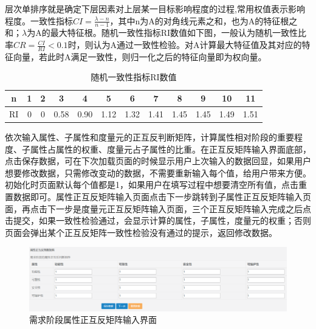 \begin{itemize}
层次单排序就是确定下层因素对上层某一目标影响程度的过程,常用权值表示影响程度\cite{刘畅2006我国火电企业投资决策影响因素评价方法及模型研究}。一致性指标$CI=\frac{\lambda-n}{n-1}$，其中n为A的对角线元素之和，也为A的特征根之和；$\lambda$为A的最大特征根。随机一致性指标RI数值如下图，一般认为随机一致性比率$CR=\frac{CI}{RI}<0.1$时，则认为A通过一致性检验。对A计算最大特征值及其对应的特征向量，若此时A满足一致性，则归一化之后的特征向量即为权向量。


\begin{table}[!ht]
    \centering
    \caption{随机一致性指标RI数值}
    \begin{tabular}{|c|c|c|c|c|c|c|c|c|c|c|c|}
        \hline
         n & 1 & 2 & 3 & 4 & 5 & 6 & 7 & 8 & 9 & 10 & 11  \\
         \hline
         RI & 0 & 0 & 0.58 & 0.90 & 1.12 & 1.32 & 1.41 & 1.45 &1.45 &1.49 & 1.51\\
        \hline
    \end{tabular}
    \label{tab-5-1}
\end{table}
\end{itemize}

依次输入属性、子属性和度量元的正互反判断矩阵，计算属性相对阶段的重要程度、子属性占属性的权重、度量元占子属性的比重。在正互反矩阵输入界面底部，点击保存数据，可在下次加载页面的时候显示用户上次输入的数据回显，如果用户想要修改数据，只需修改变动的数据，不需要重新输入每个值，给用户带来方便。初始化时页面默认每个值都是1，如果用户在填写过程中想要清空所有值，点击重置数据即可。属性正互反矩阵输入页面点击下一步跳转到子属性正互反矩阵输入页面，再点击下一步是度量元正互反矩阵输入页面，三个正互反矩阵输入完成之后点击提交，如果一致性检验通过，会显示计算的属性，子属性，度量元的权重；否则页面会弹出某个正互反矩阵一致性检验没有通过的提示，返回修改数据。
\begin{figure}[htb]
	\centering
	\includegraphics[width=13cm]{fig/5_07.png}
	\caption{需求阶段属性正互反矩阵输入界面}
	\label{fig:5_07}
\end{figure}


